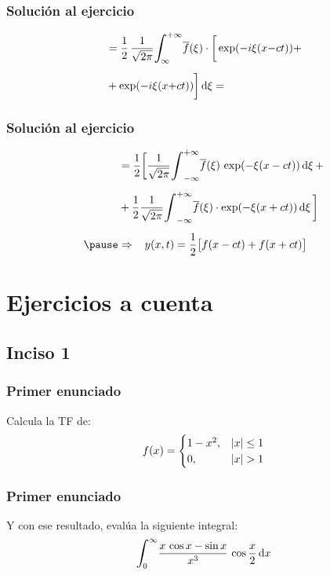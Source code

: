 \begin{frame}
\frametitle{Solución al ejercicio}
\begin{eqnarray*}
\begin{aligned}
&= \dfrac{1}{2} \, \dfrac{1}{\sqrt{2 \pi}} \scaleint{6ex}_{\bs \infty}^{+ \infty} \overline{f} (\xi) \cdot \bigg[ \exp(-i \xi (x {-} c t)) + \\[0.5em]
&+ \exp(-i \xi (x {+} c t)) \bigg] \dd{\xi} =
\end{aligned}
\end{eqnarray*}
\end{frame}
\begin{frame}
\frametitle{Solución al ejercicio}
\begin{eqnarray*}
\begin{aligned}
&= \dfrac{1}{2} \bigg[ \dfrac{1}{\sqrt{2 \pi}} \scaleint{6ex}_{-\infty}^{+\infty} \overline{f} (\xi) \, \exp(- \xi (x - c t)) \dd{\xi} + \\[0.5em]
&+ \dfrac{1}{2} \dfrac{1}{\sqrt{2 \pi}} \scaleint{6ex}_{-\infty}^{+\infty} \overline{f} (\xi) \cdot \exp(- \xi (x + c t)) \dd{\xi} \bigg] \\[0.5em] \pause
&\Rightarrow \hspace{0.3cm} y(x, t) = \dfrac{1}{2} \big[ f (x -c t) + f (x +  ct) \big]
\end{aligned}
\end{eqnarray*}
\end{frame}

\section{Ejercicios a cuenta}
\subsection{Inciso 1}

\begin{frame}
\frametitle{Primer enunciado}
Calcula la TF de:
\begin{align*}
f (x) = \begin{cases}
1 - x^{2}, & \abs{x} \leq 1 \\
0, & \abs{x} > 1
\end{cases}
\end{align*}
\end{frame}
\begin{frame}
\frametitle{Primer enunciado}
Y con ese resultado, evalúa la siguiente integral:
\begin{align*}
\scaleint{6ex}_{\bs0}^{\infty} \dfrac{x \, \cos x - \sin x}{x^{3}} \, \cos \dfrac{x}{2} \dd{x}
\end{align*}
\end{frame}

